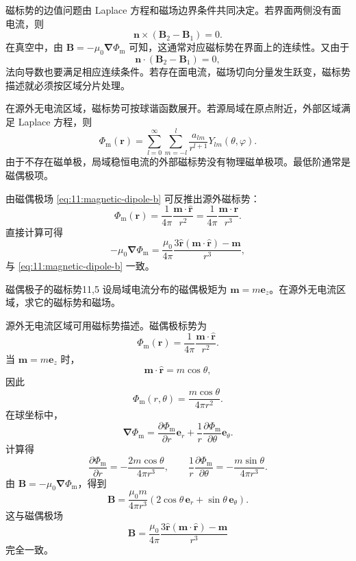 磁标势的边值问题由 Laplace 方程和磁场边界条件共同决定。若界面两侧没有面电流，则
\[
\bm{n}\times(\bm{B}_{2}-\bm{B}_{1})=0.
\]
在真空中，由 $\bm{B}=-\mu_{0}\bm{\nabla}\Phi_{\mathrm{m}}$ 可知，这通常对应磁标势在界面上的连续性。又由于
\[
\bm{n}\cdot(\bm{B}_{2}-\bm{B}_{1})=0,
\]
法向导数也要满足相应连续条件。若存在面电流，磁场切向分量发生跃变，磁标势描述就必须按区域分片处理。

在源外无电流区域，磁标势可按球谐函数展开。若源局域在原点附近，外部区域满足 Laplace 方程，则
\begin{equation}
	\Phi_{\mathrm{m}}(\bm{r})
	=
	\sum_{l=0}^{\infty}
	\sum_{m=-l}^{l}
	\frac{a_{lm}}{r^{l+1}}
	Y_{lm}(\theta,\varphi).
	\label{eq:11:magnetic-scalar-spherical-expansion}
\end{equation}
由于不存在磁单极，局域稳恒电流的外部磁标势没有物理磁单极项。最低阶通常是磁偶极项。

由磁偶极场 \eqref{eq:11:magnetic-dipole-b} 可反推出源外磁标势：
\begin{equation}
	\Phi_{\mathrm{m}}(\bm{r})
	=
	\frac{1}{4\pi}
	\frac{\bm{m}\cdot\hat{\bm{r}}}{r^{2}}
	=
	\frac{1}{4\pi}
	\frac{\bm{m}\cdot\bm{r}}{r^{3}}.
	\label{eq:11:magnetic-dipole-scalar-potential}
\end{equation}
直接计算可得
\[
-\mu_{0}\bm{\nabla}\Phi_{\mathrm{m}}
=
\frac{\mu_{0}}{4\pi}
\frac{
	3\hat{\bm{r}}(\bm{m}\cdot\hat{\bm{r}})
	-
	\bm{m}
}{r^{3}},
\]
与 \eqref{eq:11:magnetic-dipole-b} 一致。

\begin{example}{磁偶极子的磁标势}{11,5}
	设局域电流分布的磁偶极矩为 $\bm{m}=m\bm{e}_{z}$。在源外无电流区域，求它的磁标势和磁场。
	
	\begin{solution}
		源外无电流区域可用磁标势描述。磁偶极标势为
		\[
		\Phi_{\mathrm{m}}(\bm{r})
		=
		\frac{1}{4\pi}
		\frac{\bm{m}\cdot\hat{\bm{r}}}{r^{2}}.
		\]
		当 $\bm{m}=m\bm{e}_{z}$ 时，
		\[
		\bm{m}\cdot\hat{\bm{r}}
		=
		m\cos\theta,
		\]
		因此
		\[
		\Phi_{\mathrm{m}}(r,\theta)
		=
		\frac{m\cos\theta}{4\pi r^{2}}.
		\]
		在球坐标中，
		\[
		\bm{\nabla}\Phi_{\mathrm{m}}
		=
		\frac{\partial\Phi_{\mathrm{m}}}{\partial r}\bm{e}_{r}
		+
		\frac{1}{r}
		\frac{\partial\Phi_{\mathrm{m}}}{\partial\theta}\bm{e}_{\theta}.
		\]
		计算得
		\[
		\frac{\partial\Phi_{\mathrm{m}}}{\partial r}
		=
		-\frac{2m\cos\theta}{4\pi r^{3}},
		\qquad
		\frac{1}{r}
		\frac{\partial\Phi_{\mathrm{m}}}{\partial\theta}
		=
		-\frac{m\sin\theta}{4\pi r^{3}}.
		\]
		由 $\bm{B}=-\mu_{0}\bm{\nabla}\Phi_{\mathrm{m}}$，得到
		\[
		\bm{B}
		=
		\frac{\mu_{0}m}{4\pi r^{3}}
		\left(
		2\cos\theta\,\bm{e}_{r}
		+
		\sin\theta\,\bm{e}_{\theta}
		\right).
		\]
		这与磁偶极场
		\[
		\bm{B}
		=
		\frac{\mu_{0}}{4\pi}
		\frac{
			3\hat{\bm{r}}(\bm{m}\cdot\hat{\bm{r}})
			-
			\bm{m}
		}{r^{3}}
		\]
		完全一致。
	\end{solution}
\end{example}

